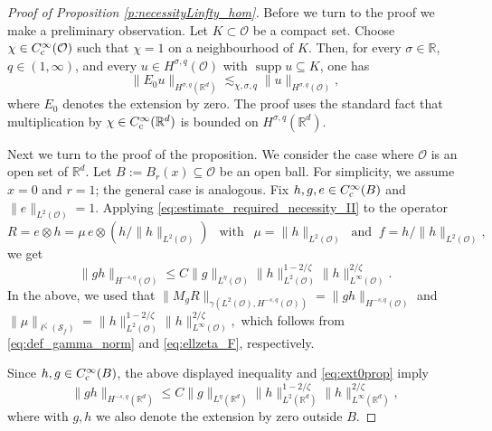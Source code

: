 \documentclass[reqno]{amsart}
\theoremstyle{plain}
\theoremstyle{remark}
\theoremstyle{plain}
\numberwithin{equation}{section}
\def\R{{\mathbb R}}
\newcommand{\Domm}{\mathcal{O}}
\newcommand{\1}{\one}
\newcommand{\Sf}{\mathcal{S}_{f}}
\begin{document}
\begin{proof}[Proof of Proposition \ref{p:necessityLinfty_hom}]
Before we turn to the proof we make a preliminary observation. 
Let \(K\subset \mathcal O\) be a compact set. Choose \(\chi\in C_{{\rm c}}^\infty(\mathcal O)\) such
that \(\chi=1\) on a neighbourhood of \(K\). Then, for every
\(\sigma\in\mathbb R\), \(q\in(1,\infty)\), and every
\(u\in H^{\sigma,q}(\mathcal O)\) with \(\operatorname{supp}u\subseteq K\),
one has
\begin{equation}\label{eq:ext0prop}
\|E_0u\|_{H^{\sigma,q}(\mathbb R^d)}
\lesssim_{\chi,\sigma,q}
\|u\|_{H^{\sigma,q}(\mathcal O)},
\end{equation}
where $E_0$ denotes the extension by zero. The proof uses the standard fact that  multiplication by
\(\chi\in C_{{\rm c}}^\infty(\mathbb R^d)\) is bounded on
\(H^{\sigma,q}(\mathbb R^d)\).


Next we turn to the proof of the proposition. We consider the case where $\Domm$ is an open set of $\R^d$.
Let $B:=B_r(x) \subseteq \Domm$ be an open ball. For simplicity, we assume $x=0$ and $r=1$; the general case is analogous.
Fix $h,g,e\in C^\infty_{{\rm c}}(B)$ and $\|e\|_{L^2(\Domm)}=1$. 
Applying \eqref{eq:estimate_required_necessity_II} to the operator  
$$
R= e\otimes h= \mu\, e\otimes (h/\|h\|_{L^2(\Domm)}) \ \ \text{ with }\ \ \mu= 
\|h\|_{L^2(\Domm)} \ \text{ and } \ f=h/\|h\|_{L^2(\Domm)},
$$
we get 
$$
\|g h\|_{H^{-s,q}(\Domm)}\leq C\|g\|_{L^\eta(\Domm)} \|h\|_{L^2(\Domm)}^{1-2/\zeta}\|h\|_{L^\infty(\Domm)}^{2/\zeta}.
$$
In the above, we used that 
$
\|M_g R\|_{\gamma(L^2(\Domm),H^{-s,q}(\Domm))} = \|g h\|_{H^{-s,q}(\Domm)}
$ 
and 
$
\|\mu\|_{\ell^\zeta(\Sf)}
= \|h\|_{L^2(\Domm)}^{1-2/\zeta}\|h\|_{L^\infty(\Domm)}^{2/\zeta},
$
which follows from \eqref{eq:def_gamma_norm} and \eqref{eq:ellzeta_F}, respectively.

Since $h,g\in C^\infty_{{\rm c}}(B)$, the above displayed inequality and \eqref{eq:ext0prop} imply
\begin{equation}
\label{eq:estimate_full_space_one_side}
\|g h\|_{H^{-s,q}(\R^d)}\leq C\|g\|_{L^\eta(\R^d)} \|h\|_{L^2(\R^d)}^{1-2/\zeta}\|h\|_{L^\infty(\R^d)}^{2/\zeta},
\end{equation}
where with $g,h$ we also denote the extension by zero outside $B$.


\end{proof}
\end{document}
